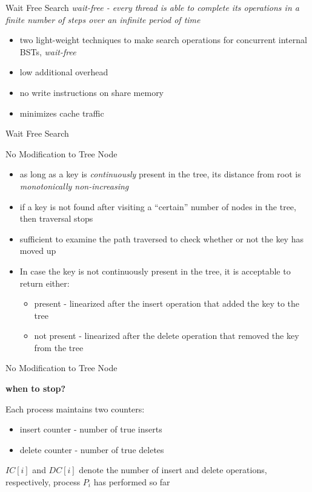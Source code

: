 \begin{frame}[c]{Wait Free Search}
\textit{wait-free - every thread is able to complete its operations in a finite number of steps over an infinite period of time}
\begin{itemize}
\item two light-weight techniques to make search operations for concurrent internal BSTs, \emph{wait-free}
\item low additional overhead
\item no write instructions on share memory
\item minimizes cache traffic
\end{itemize}
\end{frame}

\begin{frame}[c]{Wait Free Search}

\end{frame}

\begin{frame}[c]{No Modification to Tree Node}
\begin{itemize}
\item as long as a key is \emph{continuously} present in the tree, its distance from root is \emph{monotonically non-increasing}
\item if a key is not found after visiting a ``certain'' number of nodes in the tree, then traversal stops
\item sufficient to examine the path traversed to check whether or not the key has moved up
\item In case the key is not continuously present in the tree, it is acceptable to return either:
	\begin{itemize}
	\item present -  linearized after the insert operation that added the key to the tree
	\item not present - linearized after the delete operation that removed the key from the tree
	\end{itemize}
\end{itemize}
\end{frame}

\begin{frame}[c]{No Modification to Tree Node}
\begin{center}
\textbf{when to stop?}
\end{center}
\pause
Each process maintains two counters:
\begin{itemize}
\item insert counter - number of true inserts
\item delete counter - number of true deletes
\end{itemize}
$IC[i]$ and $DC[i]$ denote the number of insert and delete operations, respectively, process $P_i$ has performed so far
\end{frame}

